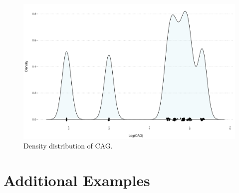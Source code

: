 \documentclass[onecolumn]{article}
\begin{document}
\begin{figure}[ht!]
  \centering
  \includegraphics[width=\linewidth]{./images/cagPlots.pdf}
      \caption{\label{fig_cag_density} Density distribution of CAG. }
\end{figure}



\clearpage
\section{Additional Examples}
\small


\end{document}
